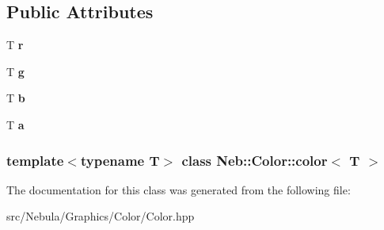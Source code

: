\subsection*{\-Public \-Attributes}
\begin{DoxyCompactItemize}
\item 
\hypertarget{classNeb_1_1Color_1_1color_a8a18346bc363bf76e839492605e0a1f4}{\-T {\bfseries r}}\label{classNeb_1_1Color_1_1color_a8a18346bc363bf76e839492605e0a1f4}

\item 
\hypertarget{classNeb_1_1Color_1_1color_a681638c1b8b3e75508c654c3b356d07c}{\-T {\bfseries g}}\label{classNeb_1_1Color_1_1color_a681638c1b8b3e75508c654c3b356d07c}

\item 
\hypertarget{classNeb_1_1Color_1_1color_a7db460b59724724bbe4d1696a72bb3dc}{\-T {\bfseries b}}\label{classNeb_1_1Color_1_1color_a7db460b59724724bbe4d1696a72bb3dc}

\item 
\hypertarget{classNeb_1_1Color_1_1color_ad30391f20a88d4ea5be687113821be7e}{\-T {\bfseries a}}\label{classNeb_1_1Color_1_1color_ad30391f20a88d4ea5be687113821be7e}

\end{DoxyCompactItemize}
\subsubsection*{template$<$typename \-T$>$ class Neb\-::\-Color\-::color$<$ T $>$}



\-The documentation for this class was generated from the following file\-:\begin{DoxyCompactItemize}
\item 
src/\-Nebula/\-Graphics/\-Color/\-Color.\-hpp\end{DoxyCompactItemize}

